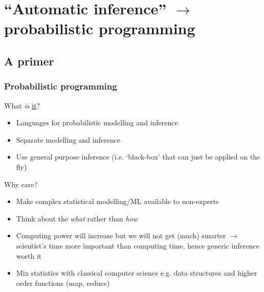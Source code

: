 \documentclass[aspectratio=169]{beamer}
\begin{document}
\section{``Automatic inference'' $\rightarrow$ probabilistic programming}
\begin{frame}
    \subsection{A primer}

    \frametitle{Probabilistic programming}
    What \emph{is} \underline{it}?
    \begin{itemize}
        \item Languages for probabilistic modelling and inference 
        \item Separate modelling and inference
        \item Use general purpose inference (i.e. `black-box' that can just be applied on the fly)
    \end{itemize}
    Why care?
    \begin{itemize}
        \item Make complex statistical modelling/ML available to non-experts
        \item Think about the \emph{what} rather than \emph{how}
        \item Computing power will increase but we will not get (much) smarter $\rightarrow$ scientist's time more important than computing time, hence generic inference worth it
        \item Mix statistics with classical computer science e.g. data structures and  higher order functions (map, reduce)
    \end{itemize}
\end{frame}




\end{document}
